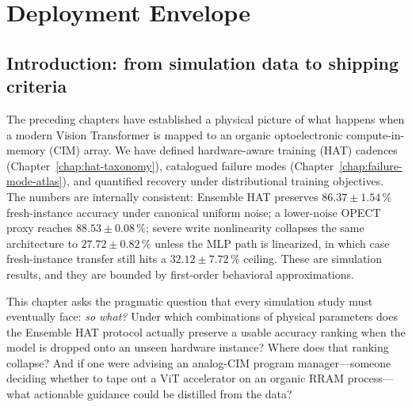 
\chapter{Deployment Envelope}
\label{chap:deployment-envelope}

\section{Introduction: from simulation data to shipping criteria}

The preceding chapters have established a physical picture of what happens when a modern Vision Transformer is mapped to an organic optoelectronic compute-in-memory (CIM) array.  We have defined hardware-aware training (HAT) cadences (Chapter~\ref{chap:hat-taxonomy}), catalogued failure modes (Chapter~\ref{chap:failure-mode-atlas}), and quantified recovery under distributional training objectives.  The numbers are internally consistent: Ensemble HAT preserves $86.37\pm1.54\,\%$ fresh-instance accuracy under canonical uniform noise; a lower-noise OPECT proxy reaches $88.53\pm0.08\,\%$; severe write nonlinearity collapses the same architecture to $27.72\pm0.82\,\%$ unless the MLP path is linearized, in which case fresh-instance transfer still hits a $32.12\pm7.72\,\%$ ceiling.  These are simulation results, and they are bounded by first-order behavioral approximations.

This chapter asks the pragmatic question that every simulation study must eventually face: \emph{so what?}  Under which combinations of physical parameters does the Ensemble HAT protocol actually preserve a usable accuracy ranking when the model is dropped onto an unseen hardware instance?  Where does that ranking collapse?  And if one were advising an analog-CIM program manager---someone deciding whether to tape out a ViT accelerator on an organic RRAM process---what actionable guidance could be distilled from the data?

